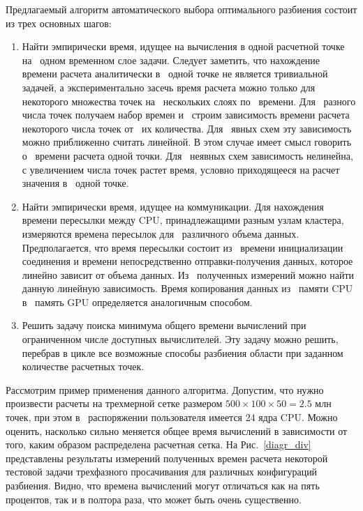 Предлагаемый алгоритм автоматического выбора оптимального разбиения состоит
из трех основных шагов:
\begin{enumerate}
 \item Найти эмпирически время, идущее на вычисления в одной расчетной точке на~
одном временном слое задачи. Следует заметить, что нахождение времени расчета
аналитически в~ одной точке не является тривиальной задачей, а экспериментально засечь
время расчета можно только для~ некоторого множества точек на~ нескольких слоях по~
времени. Для~ разного числа точек получаем набор времен и~ строим зависимость времени
расчета некоторого числа точек от~ их количества. Для~ явных схем эту зависимость
можно приближенно считать линейной. В этом случае имеет смысл говорить о~ времени
расчета одной точки. Для~ неявных схем зависимость нелинейна, с увеличением числа
точек растет время, условно приходящееся на расчет значения в~ одной точке.
\item Найти эмпирически время, идущее на коммуникации. Для нахождения времени
пересылки между CPU, принадлежащими разным узлам кластера, измеряются времена
пересылок для~ различного объема данных. Предполагается, что время пересылки
состоит из~ времени инициализации соединения и времени непосредственно 
отправки-получения данных, которое линейно зависит от объема данных. Из~ полученных 
измерений можно найти данную линейную зависимость. Время копирования данных из~ памяти
CPU в~ память GPU определяется аналогичным способом.
\item Решить задачу поиска минимума общего времени вычислений при ограниченном
числе доступных вычислителей. Эту задачу можно решить, перебрав в цикле все возможные
способы разбиения области при заданном количестве расчетных точек.
\end{enumerate}
Рассмотрим пример применения данного алгоритма. Допустим, что нужно произвести
расчеты на трехмерной сетке размером $500\times100\times50=2.5$ млн точек, при этом в~
распоряжении пользователя имеется 24 ядра CPU. Можно оценить, насколько сильно
меняется общее время вычислений в зависимости от того, каким образом распределена
расчетная сетка. На Рис.~\ref{diagr_div} представлены результаты измерений полученных времен 
расчета некоторой тестовой задачи трехфазного просачивания для различных конфигураций разбиения.
Видно, что времена вычислений могут отличаться как на пять процентов,
так и в полтора раза, что может быть очень существенно.

